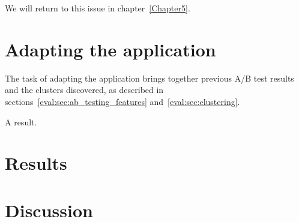 We will return to this issue in chapter~\ref{Chapter5}.

\section{Adapting the application} %
\label{eval:sec:adapting_the_application}

The task of adapting the application brings together previous A/B test results and the clusters discovered, as described in sections~\ref{eval:sec:ab_testing_features} and~\ref{eval:sec:clustering}.

\begin{table}
  
  \caption{A result.}
  \label{tab:results}
\end{table}

\section{Results} %
\label{eval:sec:results}



\section{Discussion} %
\label{eval:sec:discussion}

